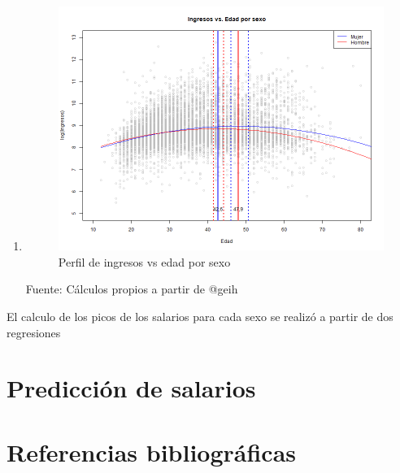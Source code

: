 \documentclass[
  11pt,
  letterpaper,
]{article}
\begin{document}
\begin{enumerate}
\def\labelenumi{\alph{enumi})}
\setcounter{enumi}{2}
\item
  \begin{figure}
  \includegraphics[width=0.7\linewidth]{../views/earnings_peak_ages} \caption{Perfil de ingresos vs edad por sexo}\label{fig:unnamed-chunk-2}
  \end{figure}
  \begin{center}\footnotesize{Fuente: Cálculos propios a partir de @geih}\end{center}
\end{enumerate}

El calculo de los picos de los salarios para cada sexo se realizó a
partir de dos regresiones

\hypertarget{predicciuxf3n-de-salarios}{%
\section{Predicción de salarios}\label{predicciuxf3n-de-salarios}}

\hypertarget{referencias-bibliogruxe1ficas}{%
\section{Referencias
bibliográficas}\label{referencias-bibliogruxe1ficas}}
\end{document}
